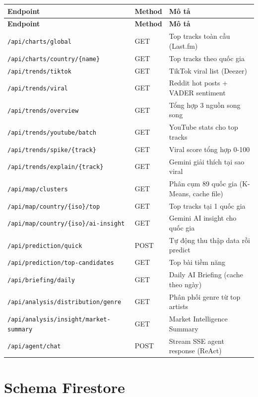 \documentclass[12pt,a4paper]{report}
\begin{document}
\begin{longtable}{|l|l|p{6.5cm}|}
\hline
\textbf{Endpoint} & \textbf{Method} & \textbf{Mô tả} \\
\hline
\endfirsthead
\hline
\textbf{Endpoint} & \textbf{Method} & \textbf{Mô tả} \\
\hline
\endhead
\texttt{/api/charts/global} & GET & Top tracks toàn cầu (Last.fm) \\
\hline
\texttt{/api/charts/country/\{name\}} & GET & Top tracks theo quốc gia \\
\hline
\texttt{/api/trends/tiktok} & GET & TikTok viral list (Deezer) \\
\hline
\texttt{/api/trends/viral} & GET & Reddit hot posts + VADER sentiment \\
\hline
\texttt{/api/trends/overview} & GET & Tổng hợp 3 nguồn song song \\
\hline
\texttt{/api/trends/youtube/batch} & GET & YouTube stats cho top tracks \\
\hline
\texttt{/api/trends/spike/\{track\}} & GET & Viral score tổng hợp 0-100 \\
\hline
\texttt{/api/trends/explain/\{track\}} & GET & Gemini giải thích tại sao viral \\
\hline
\texttt{/api/map/clusters} & GET & Phân cụm 89 quốc gia (K-Means, cache file) \\
\hline
\texttt{/api/map/country/\{iso\}/top} & GET & Top tracks tại 1 quốc gia \\
\hline
\texttt{/api/map/country/\{iso\}/ai-insight} & GET & Gemini AI insight cho quốc gia \\
\hline
\texttt{/api/prediction/quick} & POST & Tự động thu thập data rồi predict \\
\hline
\texttt{/api/prediction/top-candidates} & GET & Top bài tiềm năng \\
\hline
\texttt{/api/briefing/daily} & GET & Daily AI Briefing (cache theo ngày) \\
\hline
\texttt{/api/analysis/distribution/genre} & GET & Phân phối genre từ top artists \\
\hline
\texttt{/api/analysis/insight/market-summary} & GET & Market Intelligence Summary \\
\hline
\texttt{/api/agent/chat} & POST & Stream SSE agent response (ReAct) \\
\hline
\end{longtable}

\section{Schema Firestore}
\end{document}
